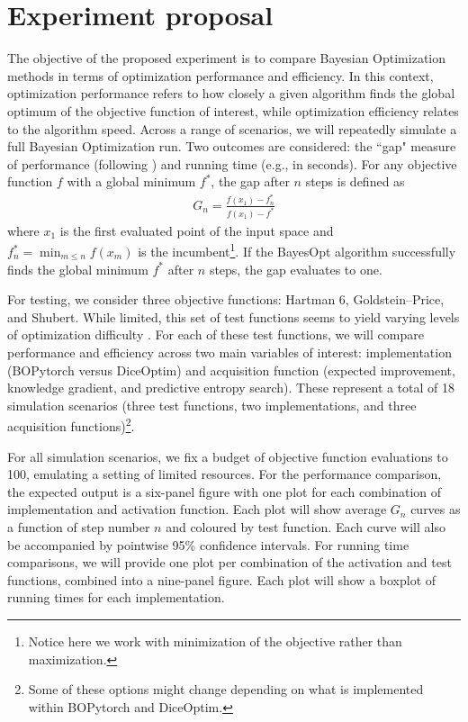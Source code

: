 

\section{Experiment proposal}

The objective of the proposed experiment is to compare Bayesian Optimization methods in terms of optimization performance and efficiency. In this context, optimization performance refers to how closely a given algorithm finds the global optimum of the objective function of interest, while optimization efficiency relates to the algorithm speed. Across a range of scenarios, we will repeatedly simulate a full Bayesian Optimization run. Two outcomes are considered: the ``gap" measure of performance (following \cite{Huang2006}) and running time (e.g., in seconds). For any objective function $f$ with a global minimum $f^*$, the gap after $n$ steps is defined as
\begin{align}
    G_n = \frac{f(x_1) - f_n^*}{f(x_1)-f^*}\label{gap}
\end{align}
where $x_1$ is the first evaluated point of the input space and $f_n^*=\min_{m\leq n}f(x_m)$ is the incumbent\footnote{Notice here we work with minimization of the objective rather than maximization.}. If the BayesOpt algorithm successfully finds the global minimum $f^*$ after $n$ steps, the gap evaluates to one.

For testing, we consider three objective functions: Hartman 6, Goldstein–Price, and Shubert. While limited, this set of test functions seems to yield varying levels of optimization difficulty \cite{Osborne2009}. For each of these test functions, we will compare performance and efficiency across two main variables of interest:
implementation (BOPytorch versus DiceOptim) and acquisition function (expected improvement, knowledge gradient, and predictive entropy search). These represent a total of 18 simulation scenarios (three test functions, two implementations, and three acquisition functions)\footnote{Some of these options might change depending on what is implemented within BOPytorch and DiceOptim.}.

For all simulation scenarios, we fix a budget of objective function evaluations to 100, emulating a setting of limited resources. For the performance comparison, the expected output is a six-panel figure with one plot for each combination of implementation and activation function. Each plot will show average $G_n$ curves as a function of step number $n$ and coloured by test function. Each curve will also be accompanied by pointwise 95\% confidence intervals. For running time comparisons, we will provide one plot per combination of the activation and test functions, combined into a nine-panel figure. Each plot will show a boxplot of running times for each implementation.

